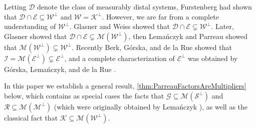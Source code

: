 \documentclass[graybox]{svmult}
\theoremstyle{definition}
\newcommand{\rsout}[1]{{\color{red}\sout{#1}}}
\begin{document}
Letting $\mathcal{D}$ denote the class of measurably distal systems, Furstenberg \cite{DisjointnessInErgodicTheory} had shown that $\mathcal{D}\cap\mathcal{E} \subseteq \mathcal{W}^\perp$ and $\mathcal{W} = \mathcal{K}^\perp$.
However, we are far from a complete understanding of $\mathcal{W}^\perp$. 
Glasner and Weiss \cite{MultWPerpBiggerThanDist} showed that $\mathcal{D}\cap\mathcal{E} \subsetneq \mathcal{W}^\perp$. 
Later, Glasner \cite{WPerpAndItsMultipliers} showed that $\mathcal{D}\cap\mathcal{E} \subsetneq \mathscr{M}(\mathcal{W}^\perp)$, then Lema\'nczyk and Parreau \cite{RokhlinExtensionsLiftingDisjointness} showed that $\mathscr{M}(\mathcal{W}^\perp) \subsetneq \mathcal{W}^\perp$.
Recently Berk, G\'orska, and de la Rue \cite{ErgodicPerp} showed that $\mathcal{I} = \mathscr{M}(\mathcal{E}^\perp) \subsetneq \mathcal{E}^\perp$, and a complete characterization of $\mathcal{E}^\perp$ was obtained by G\'orska, Lema\'nczyk, and de la Rue \cite{UniquelyErgodicPerp}.


In this paper we establish a general result, \cref{thm:ParreauFactorsAreMultipliers} below, which contains as special cases the facts that $\mathcal{G} \subseteq \mathscr{M}(\mathcal{S}^\perp)$ and $\mathcal{R} \subseteq\mathscr{M}(\mathcal{M}^\perp)$ (which were originally obtained by Lema\'nczyk ), as well as the classical fact that $\mathcal{K} \subseteq \mathscr{M}(\mathcal{W}^\perp)$.
\end{document}
